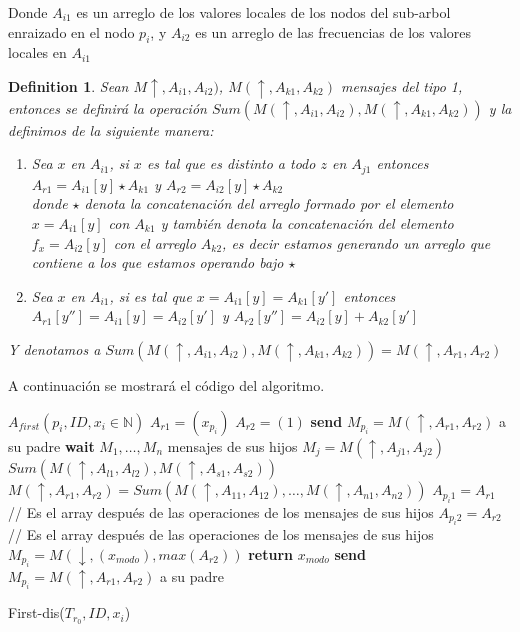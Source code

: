 \documentclass[10pt]{report}
\newtheorem{definition}{Definition}
\begin{document}
Donde $A_{i1}$ es un arreglo de los valores locales de los nodos del sub-arbol enraizado
en el nodo $p_{i}$, y $A_{i2}$ es un arreglo de las frecuencias de los valores locales en $A_{i1}$
\\

\begin{definition}
Sean $M\uparrow, A_{i1}, A_{i2})$, $M(\uparrow, A_{k1}, A_{k2})$ mensajes del tipo 1, entonces se definirá la operación $Sum(M(\uparrow, A_{i1}, A_{i2}), M(\uparrow, A_{k1}, A_{k2}))$ y la definimos
de la siguiente manera:\\
\begin{enumerate}
    \item Sea $x$ en $A_{i1}$, si $x$ es tal que es distinto a todo $z$ en $A_{j1}$
     entonces \\ $A_{r1} = A_{i1}[y] \star A_{k1}$ y $A_{r2} = A_{i2}[y] \star A_{k2}$ \\
     donde $\star$ denota la concatenación del arreglo formado por el elemento  $x = A_{i1}[y]$ con $A_{k1}$ y también denota
     la concatenación del elemento $f_{x} = A_{i2}[y]$ con el arreglo $A_{k2}$, es decir estamos generando un arreglo
     que contiene a los que estamos operando bajo $\star$
    \item Sea $x$ en $A_{i1}$, si es tal que $x = A_{i1}[y] = A_{k1}[y']$ entonces $A_{r1}[y''] = A_{i1}[y] = A_{i2}[y']$  y
    $A_{r2}[y''] = A_{i2}[y] + A_{k2}[y']$
\end{enumerate}

Y denotamos a $Sum(M(\uparrow,A_{i1}, A_{i2}), M(\uparrow, A_{k1}, A_{k2})) = M(\uparrow, A_{r1}, A_{r2})$
\end{definition}
\newpage

A continuación se mostrará el código del algoritmo.


\begin{algorithm}
\begin{algorithmic}
    \STATE $A_{first}( p_{i}, ID, x_{i} \in \mathbb{N})$
      \STATE $A_{r1} = (x_{p_{i}})$
      \STATE $A_{r2} = (1)$
      \STATE \textbf{send} $M_{p_{i}} = M(\uparrow, A_{r1}, A_{r2})$ a su padre
    \ELSE
      \STATE \textbf{wait} $M_{1},\dots,M_{n}$ mensajes de sus hijos
      \STATE  $M_{j} = M(\uparrow, A_{j1}, A_{j2})$
        \STATE $Sum(M(\uparrow, A_{l1}, A_{l2}), M(\uparrow, A_{s1}, A_{s2}))$
      \ENDFOR
      \STATE $M(\uparrow, A_{r1}, A_{r2}) = Sum(M(\uparrow, A_{11}, A_{12}), \dots, M(\uparrow, A_{n1}, A_{n2})) $
      \STATE $A_{p_{i}1} = A_{r1}$ // Es el array después de las operaciones de los mensajes de sus hijos
      \STATE $A_{p_{i}2} = A_{r2}$ // Es el array después de las operaciones de los mensajes de sus hijos
        \STATE $M_{p_{i}} = M(\downarrow, (x_{modo}), max(A_{r2}))$
        \STATE \textbf{return} $x_{modo}$
      \ELSE
        \STATE \textbf{send} $M_{p_{i}} = M(\uparrow, A_{r1}, A_{r2})$ a su padre
      \ENDIF
    \ENDIF
\end {algorithmic}
\caption{First-dis($T_{r_0},ID,x_{i}$)\label{lss}}
\end{algorithm}
\end{document}
